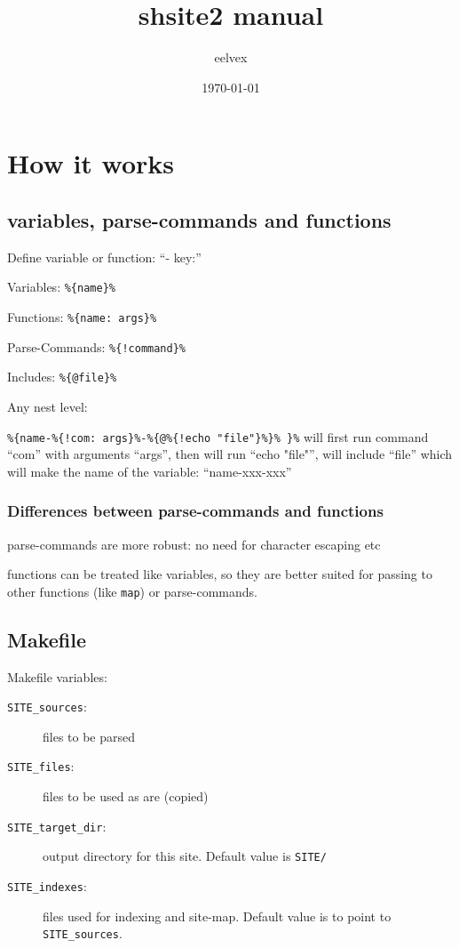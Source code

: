 \documentclass{memoir}
\title{shsite2 manual}
\author{eelvex}
\date{\today}
\newcommand{\var}[1]{\texttt{\%\{#1\}\%}}
\begin{document}
\begin{titlingpage}
\maketitle
\end{titlingpage}
\tableofcontents

\chapter{How it works} %

\section{variables, parse-commands and functions} %

	Define variable or function: ``- key:''

	Variables: \var{name}

	Functions: \var{name: args}

	Parse-Commands: \var{!command}

	Includes:  \var{@file}

	Any nest level:

	\var{name-\var{!com: args}-\var{@\var{!echo "file"}} }
	will first run command ``com'' with arguments ``args'', then will run ``echo "file"'', will include ``file''
	which will make the name of the variable: ``name-xxx-xxx''

	\subsection{Differences between parse-commands and functions} %
		parse-commands are more robust: no need for character escaping etc

		functions can be treated like variables, so they are better
		suited for passing to other functions (like \texttt{map}) or parse-commands.




\section{Makefile} %

Makefile variables:
\begin{description}
\item[\texttt{SITE\_sources}:] files to be parsed
\item[\texttt{SITE\_files}:] files to be used as are (copied)
\item[\texttt{SITE\_target\_dir}:] output directory for this site. Default value is \texttt{SITE/}
\item[\texttt{SITE\_indexes}:] files used for indexing and site-map. Default value is to point to \texttt{SITE\_sources}.
\end{description}
\end{document}
